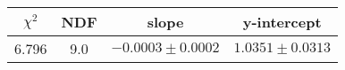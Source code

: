 \begin{tabular}{|c|c|c|c|}

\hline
$\chi^{2}$ & NDF & slope & y-intercept  \\
\hline
6.796 & 9.0 & $-0.0003\pm0.0002$ & $1.0351\pm0.0313$ \\
\hline

\end{tabular}